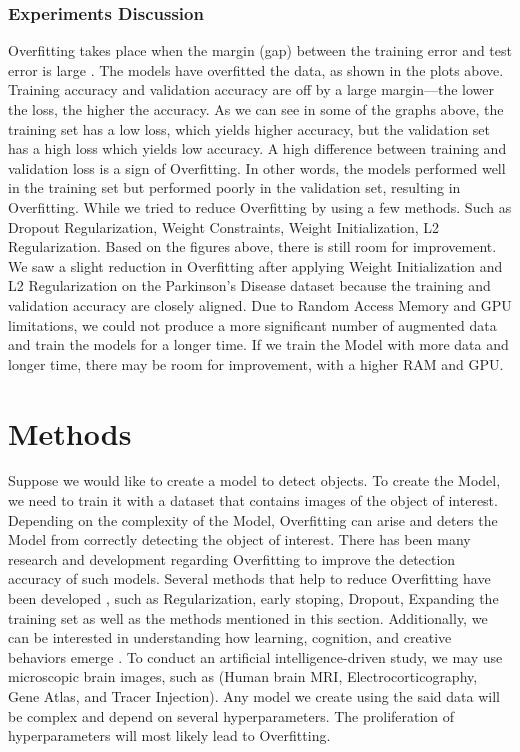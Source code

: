 \documentclass[oneside,12pt,article]{article}
\begin{document}
 \subsubsection{Experiments Discussion }
Overfitting takes place when the margin (gap) between the training error and test error is large \cite{bengio2017deep}. The models have overfitted the data, as shown in the plots above. Training accuracy and validation accuracy are off by a large margin—the lower the loss, the higher the accuracy. As we can see in some of the graphs above, the training set has a low loss, which yields higher accuracy, but the validation set has a high loss which yields low accuracy. A high difference between training and validation loss is a sign of Overfitting. In other words, the models performed well in the training set but performed poorly in the validation set, resulting in Overfitting. While we tried to reduce Overfitting by using a few methods. Such as Dropout Regularization, Weight Constraints, Weight Initialization, L2 Regularization. Based on the figures above, there is still room for improvement. We saw a slight reduction in Overfitting after applying Weight Initialization and L2 Regularization on the Parkinson's Disease dataset because the training and validation accuracy are closely aligned. Due to Random Access Memory and GPU limitations, we could not produce a more significant number of augmented data and train the models for a longer time. If we train the Model with more data and longer time, there may be room for improvement, with a higher RAM and GPU.  



\section{Methods}
Suppose we would like to create a model to detect objects. To create the Model, we need to train it with a dataset that contains images of the object of interest. Depending on the complexity of the Model, Overfitting can arise and deters the Model from correctly detecting the object of interest. There has been many research and development regarding Overfitting to improve the detection accuracy of such models. Several methods that help to reduce Overfitting have been developed \cite{bengio2017deep}\cite{ying2019overview}, such as Regularization, early stoping, Dropout, Expanding the training set as well as the methods mentioned in this section. Additionally, we can be interested in understanding how learning, cognition, and creative behaviors emerge \cite{yin2020network}. To conduct an artificial intelligence-driven study, we may use microscopic brain images, such as (Human brain MRI, Electrocorticography, Gene Atlas, and Tracer Injection). Any model we create using the said data will be complex and depend on several hyperparameters. The proliferation of hyperparameters will most likely lead to Overfitting. 
\end{document}
